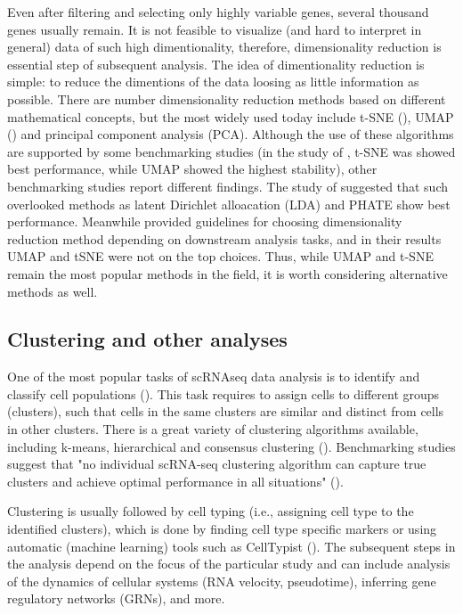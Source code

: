 Even after filtering and selecting only highly variable genes, several thousand genes usually remain.
It is not feasible to visualize (and hard to interpret in general) data of such high dimentionality, therefore,
dimensionality reduction is essential step of subsequent analysis.
The idea of dimentionality reduction is simple:
to reduce the dimentions of the data loosing as little information as possible.
There are number dimensionality reduction methods based on different mathematical concepts,
but the most widely used today include
t-SNE (\cite{Hinton2002}), UMAP (\cite{McInnes2018}) and principal component analysis (PCA).
Although the use of these algorithms are supported by some benchmarking studies
(in the study of \textcite{Xiang2021}, t-SNE was showed best performance, while UMAP showed the highest stability),
other benchmarking studies report different findings.
The study of \textcite{Koch2021} suggested that such overlooked methods as
latent Dirichlet alloacation (LDA) and PHATE show best performance.
Meanwhile \textcite{Sun2019} provided guidelines for choosing dimensionality reduction method
depending on downstream analysis tasks, and in their results UMAP and tSNE were not on the top choices.
Thus, while UMAP and t-SNE remain the most popular methods in the field,
it is worth considering alternative methods as well.

\subsection{Clustering and other analyses}

One of the most popular tasks of scRNAseq data analysis is to identify and classify cell populations (\cite{Andrews2018}).
This task requires to assign cells to different groups (clusters),
such that cells in the same clusters are similar and distinct from cells in other clusters.
There is a great variety of clustering algorithms available,
including k-means, hierarchical and consensus clustering (\cite{Peng2020}).
Benchmarking studies suggest that "no individual scRNA-seq clustering algorithm can capture true clusters and achieve
optimal performance in all situations" (\cite{Peng2020}).

Clustering is usually followed by cell typing (i.e., assigning cell type to the identified clusters),
which is done by finding cell type specific markers
or using automatic (machine learning) tools such as CellTypist (\cite{Dom2022}).
The subsequent steps in the analysis depend on the focus of the particular study and can include
analysis of the dynamics of cellular systems (RNA velocity, pseudotime),
inferring gene regulatory networks (GRNs), and more.

